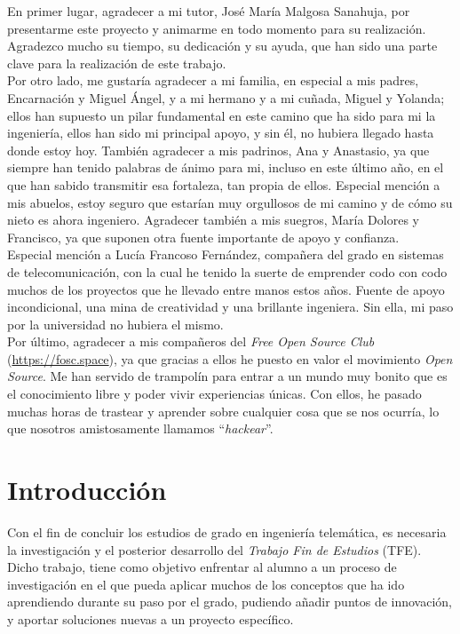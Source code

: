 \documentclass[a4paper, oneside, 12pt]{book}
\begin{document}
	\noindent En primer lugar, agradecer a mi tutor, José María Malgosa Sanahuja, por presentarme este proyecto y animarme en todo momento para su realización. Agradezco mucho su tiempo, su dedicación y su ayuda, que han sido una parte clave para la realización de este trabajo. \\
	
	\noindent Por otro lado, me gustaría agradecer a mi familia, en especial a mis padres, Encarnación y Miguel Ángel, y a mi hermano y a mi cuñada, Miguel y Yolanda; ellos han supuesto un pilar fundamental en este camino que ha sido para mi la ingeniería, ellos han sido mi principal apoyo, y sin él, no hubiera llegado hasta donde estoy hoy. También agradecer a mis padrinos, Ana y Anastasio, ya que siempre han tenido palabras de ánimo para mi, incluso en este último año, en el que han sabido transmitir esa fortaleza, tan propia de ellos. Especial mención a mis abuelos, estoy seguro que estarían muy orgullosos de mi camino y de cómo su nieto es ahora ingeniero. Agradecer también a mis suegros, María Dolores y Francisco, ya que suponen otra fuente importante de apoyo y confianza. \\
	
	\noindent Especial mención a Lucía Francoso Fernández, compañera del grado en sistemas de telecomunicación, con la cual he tenido la suerte de emprender codo con codo muchos de los proyectos que he llevado entre manos estos años. Fuente de apoyo incondicional, una mina de creatividad y una brillante ingeniera. Sin ella, mi paso por la universidad no hubiera el mismo. \\
	
	\noindent Por último, agradecer a mis compañeros del \textit{Free Open Source Club} (\url{https://fosc.space}), ya que gracias a ellos he puesto en valor el movimiento \textit{Open Source}. Me han servido de trampolín para entrar a un mundo muy bonito que es el conocimiento libre y poder vivir experiencias únicas. Con ellos, he pasado muchas horas de trastear y aprender sobre cualquier cosa que se nos ocurría, lo que nosotros amistosamente llamamos ``\textit{hackear}''. 
		
	\pagebreak
	
	\chapter{Introducción}
	
	\noindent Con el fin de concluir los estudios de grado en ingeniería telemática, es necesaria la investigación y el posterior desarrollo del \textit{Trabajo Fin de Estudios} (TFE). Dicho trabajo, tiene como objetivo enfrentar al alumno a un proceso de investigación en el que pueda aplicar muchos de los conceptos que ha ido aprendiendo durante su paso por el grado, pudiendo añadir puntos de innovación, y aportar soluciones nuevas a un proyecto específico. \\
	
\end{document}
